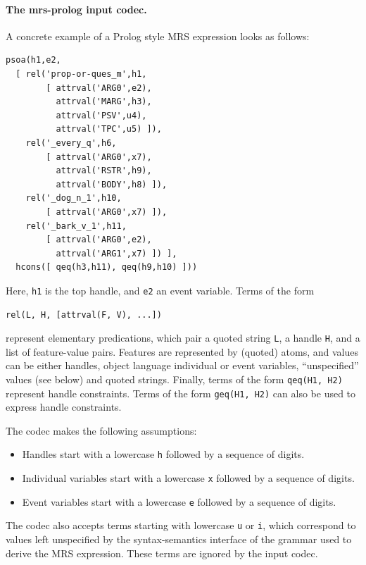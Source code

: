 \paragraph{The mrs-prolog input codec.}

A concrete example of a Prolog style MRS expression looks as follows:

\begin{verbatim}
psoa(h1,e2,
  [ rel('prop-or-ques_m',h1,
        [ attrval('ARG0',e2),
          attrval('MARG',h3),
          attrval('PSV',u4),
          attrval('TPC',u5) ]),
    rel('_every_q',h6,
        [ attrval('ARG0',x7),
          attrval('RSTR',h9),
          attrval('BODY',h8) ]),
    rel('_dog_n_1',h10,
        [ attrval('ARG0',x7) ]),
    rel('_bark_v_1',h11,
        [ attrval('ARG0',e2),
          attrval('ARG1',x7) ]) ],
  hcons([ qeq(h3,h11), qeq(h9,h10) ]))
\end{verbatim}

Here, \verb|h1| is the top handle, and \verb|e2| an event
variable. Terms of the form 

\begin{verbatim} 
rel(L, H, [attrval(F, V), ...]) 
\end{verbatim} 

represent elementary predications, which pair a quoted string
\verb|L|, a handle \verb|H|, and a list of feature-value pairs.
Features are represented by (quoted) atoms, and values can be either
handles, object language individual or event variables,
``unspecified'' values (see below) and quoted strings. Finally, terms
of the form \verb|qeq(H1, H2)| represent handle constraints. Terms of
the form \verb|geq(H1, H2)| can also be used to express handle
constraints.

The codec makes the following assumptions:
\begin{itemize}
\item Handles start with a lowercase \verb|h| followed by a sequence
  of digits.
\item Individual variables start with a lowercase \verb|x| followed by
  a sequence of digits.
\item Event variables start with a lowercase \verb|e| followed by a
  sequence of digits.
\end{itemize}
The codec also accepts terms starting with lowercase \verb|u| or
\verb|i|, which correspond to values left unspecified by the
syntax-semantics interface of the grammar used to derive the MRS
expression. These terms are ignored by the input codec.

